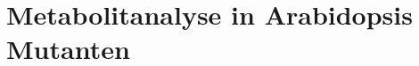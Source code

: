 
\section{Metabolitanalyse in Arabidopsis Mutanten}\label{sec:metabolitanalyse-in-arabidopsis-mutanten}




